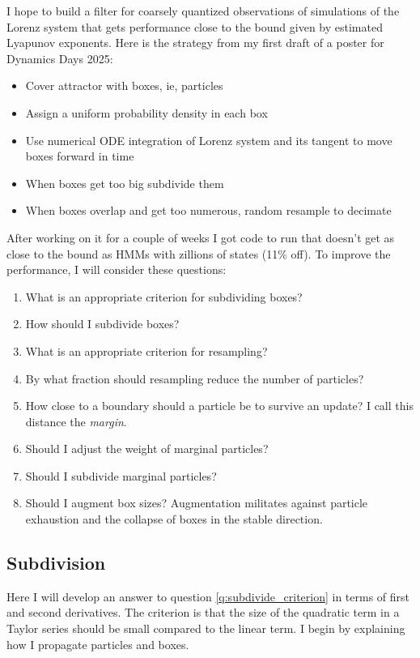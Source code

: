 \documentclass[12pt]{article}
\begin{document}
I hope to build a filter for coarsely quantized observations of
simulations of the Lorenz system that gets performance close to the
bound given by estimated Lyapunov exponents.  Here is the strategy
from my first draft of a poster for Dynamics Days 2025:
\begin{itemize}
\item Cover attractor with boxes, ie, particles
\item Assign a uniform probability density in each box
\item Use numerical ODE integration of Lorenz system and its tangent
  to move boxes forward in time
\item When boxes get too big subdivide them
\item When boxes overlap and get too numerous, random resample to
  decimate
\end{itemize}

After working on it for a couple of weeks I got code to run that
doesn't get as close to the bound as HMMs with zillions of states
(11\% off).  To improve the performance, I will consider these
questions:
\begin{enumerate}
\item \label{q:subdivide_criterion} What is an appropriate criterion
  for subdividing boxes?
\item How should I subdivide boxes?
\item What is an appropriate criterion for resampling?
\item By what fraction should resampling reduce the number of
  particles?
\item How close to a boundary should a particle be to survive an
  update?  I call this distance the \emph{margin}.
\item Should I adjust the weight of marginal particles?
\item Should I subdivide marginal particles?
\item Should I augment box sizes?  Augmentation militates against
  particle exhaustion and the collapse of boxes in the stable
  direction.
\end{enumerate}

\subsection{Subdivision}
\label{sec:subdivision}

Here I will develop an answer to question \ref{q:subdivide_criterion}
in terms of first and second derivatives.  The criterion is that the
size of the quadratic term in a Taylor series should be small compared
to the linear term.  I begin by explaining how I propagate particles
and boxes.
\end{document}
